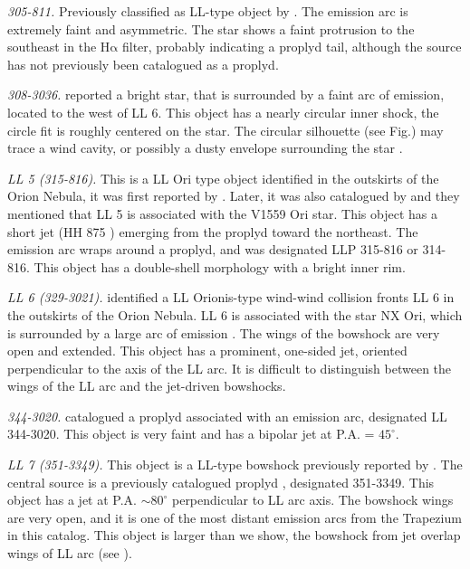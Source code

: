 \documentclass[iop, apj]{emulateapj}
\newcommand\ha{\ensuremath{\mathrm{H\alpha}}}
\begin{document}
\textit{305-811.} Previously classified as LL-type object by \citet{Bally:2006a}. The emission arc is extremely faint and asymmetric. The star shows  a faint protrusion to the southeast in the \ha{} filter, probably indicating a proplyd tail, although the source has not previously been catalogued as a proplyd.    

\textit{308-3036.} \citet{Bally:2006a} reported a bright star, that is surrounded by a faint arc of emission, located to the west of LL 6. This object has a nearly circular inner shock, the circle fit is roughly centered on the star. The circular silhouette (see Fig.) may trace a wind cavity, or possibly a dusty envelope surrounding the star \citep{Bally:2006a}.       

\textit{LL 5 (315-816).} This is a LL Ori type object identified in the outskirts of the Orion Nebula, it was first reported by \citet{Bally:2001a}. Later, it was also catalogued by \citet{Bally:2006a} and they mentioned that LL 5 is associated with the  V1559 Ori star. This object has a short jet (HH 875 \citealp{Bally:2006a}) emerging from the proplyd toward the northeast.  The emission arc wraps around a proplyd, and was designated LLP 315-816 or 314-816. This object has a double-shell morphology with a bright inner rim.
       
\textit{LL 6 (329-3021).} \citep{Bally:2001a} identified a LL Orionis-type wind-wind collision fronts LL 6 in the outskirts of the Orion Nebula. LL 6 is associated with the star NX Ori, which is surrounded by a large arc of emission \citep{Bally:2006a}. The wings of the bowshock are very open and extended. This object has a prominent, one-sided jet, oriented perpendicular to the axis of the LL arc. It is difficult to distinguish between the wings of the LL arc and the jet-driven bowshocks.    

\textit{344-3020.} \citet{Bally:2006a} catalogued a proplyd associated with an emission arc, designated LL 344-3020. This object is very faint and has a bipolar jet at P.A. = $45^{\circ}$.     

\textit{LL 7 (351-3349).} This object is a LL-type bowshock previously reported by \citet{Bally:2001a}. The central source is a previously catalogued proplyd \citep{Ricci:2008a}, designated 351-3349. This object has a jet at P.A. $\sim 80^{\circ}$ perpendicular to LL arc axis. The  bowshock  wings are very open, and it is one of the most distant emission arcs from the Trapezium in this catalog. This object is larger than we show, the bowshock from jet overlap wings of LL arc (see \citealp{Bally:2001a}).   
\end{document}
